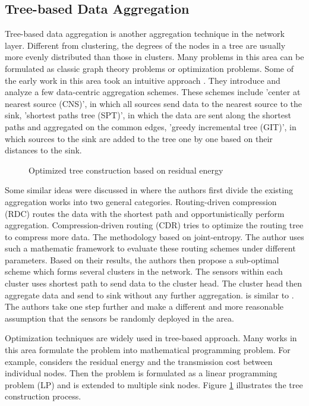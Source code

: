 \subsection{Tree-based Data Aggregation}
Tree-based data aggregation is another aggregation technique in the network layer. Different from clustering, the degrees of the nodes in a tree are usually more evenly distributed than those in clusters. Many problems in this area can be formulated as classic graph theory problems or optimization problems. Some of the early work in this area took an intuitive approach \cite{impactaggregation}. They introduce and analyze a few data-centric aggregation schemes. These schemes include 'center at nearest source (CNS)', in which all sources send data to the nearest source to the sink, 'shortest paths tree (SPT)', in which the data are sent along the shortest paths and aggregated on the common edges, 'greedy incremental tree (GIT)', in which sources to the sink are added to the tree one by one based on their distances to the sink.

\begin{figure}
\centering
{}
\caption{Optimized tree construction based on residual energy}
\label{fig:lpt}
\end{figure}

Some similar ideas were discussed in \cite{pattem:impact} where the authors first divide the existing aggregation works into two general categories. Routing-driven compression (RDC) routes the data with the shortest path and opportunistically perform aggregation. Compression-driven routing (CDR) tries to optimize the routing tree to compress more data. The methodology based on joint-entropy. The author uses such a mathematic framework to evaluate these routing schemes under different parameters. Based on their results, the authors then propose a sub-optimal scheme which forms several clusters in the network. The sensors within each cluster uses shortest path to send data to the cluster head. The cluster head then aggregate data and send to sink without any further aggregation. \cite{asc} is similar to \cite{pattem:impact}. The authors take one step further and make a different and more reasonable assumption that the sensors be randomly deployed in the area.

Optimization techniques are widely used in tree-based approach. Many works in this area formulate the problem into mathematical programming problem. For example, \cite{xue:lp} considers the residual energy and the transmission cost between individual nodes. Then the problem is formulated as a linear programming problem (LP) and is extended to multiple sink nodes. Figure \ref{fig:lpt} illustrates the tree construction process.

